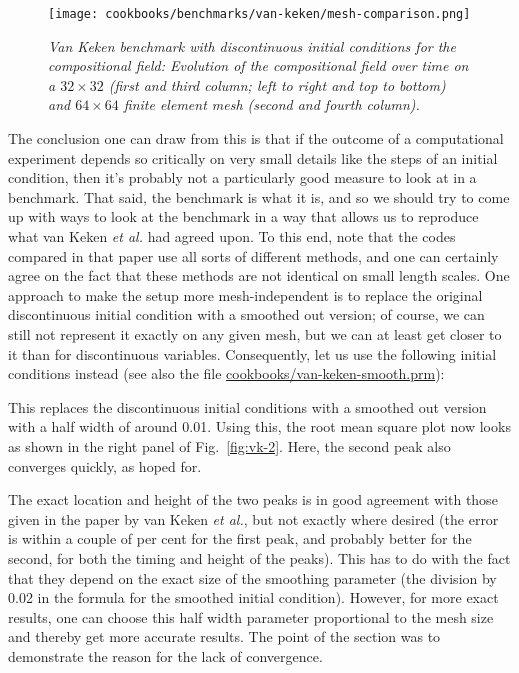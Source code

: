 \documentclass{article}
\begin{document}
\begin{figure}
  \centering
  \texttt{[image: cookbooks/benchmarks/van-keken/mesh-comparison.png]}
  \caption{\it Van Keken benchmark with discontinuous initial conditions for the
  compositional field:
  Evolution of the compositional field over time on a $32\times 32$ (first and
  third column; left to right and top to bottom) and $64\times 64$ finite
  element mesh (second and fourth column).}
  \label{fig:vk-4}
\end{figure}

The conclusion one can draw from this is that if the outcome of a computational
experiment depends so critically on very small details like the steps of an
initial condition, then it's probably not a particularly good measure to look at
in a benchmark. That said, the benchmark is what it is, and so we should try to
come up with ways to look at the benchmark in a way that allows us to reproduce
what van Keken \textit{et al.} had agreed upon. To this end, note that the codes
compared in that paper use all sorts of different methods, and one can certainly
agree on the fact that these methods are not identical on small length scales.
One approach to make the setup more mesh-independent is to replace the original
discontinuous initial condition with a smoothed out version; of course, we can
still not represent it exactly on any given mesh, but we can at least get closer
to it than for discontinuous variables. Consequently, let us use the following
initial conditions instead (see also the file
\url{cookbooks/van-keken-smooth.prm}):


This replaces the discontinuous initial conditions with a smoothed out version
with a half width of around 0.01. Using this, the root mean square plot now
looks as shown in the right panel of Fig.~\ref{fig:vk-2}. Here, the second peak
also converges quickly, as hoped for.

The exact location and height of the two peaks is in good agreement with those
given in the paper by van Keken \textit{et al.}, but not exactly where desired
(the error is within a couple of per cent for the first peak, and probably
better for the second, for both the timing and height of the peaks).
This has to do with the fact that they depend on the exact size of the smoothing
parameter (the division by 0.02 in the formula for the smoothed initial
condition). However, for more exact results, one can choose
this half width parameter proportional to the mesh size and thereby get more
accurate results. The point of the section was to demonstrate the reason
for the lack of convergence.
\end{document}
